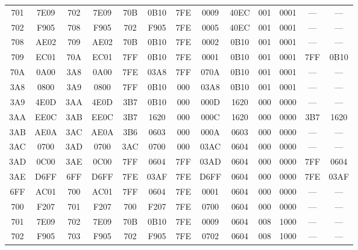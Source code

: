 \begin{flushleft}
\begin{tabular}{|c|c|c|c|c|c|c|c|c|c|c|c|c|}
		701 & 7E09 & 702 & 7E09 & 70B & 0B10 & 7FE & 0009 & 40EC & 001 & 0001 & --- & ---	\\

		702 & F905 & 708 & F905 & 702 & F905 & 7FE & 0005 & 40EC & 001 & 0001 & --- & ---	\\

		708 & AE02 & 709 & AE02 & 70B & 0B10 & 7FE & 0002 & 0B10 & 001 & 0001 & --- & ---	\\

		709 & EC01 & 70A & EC01 & 7FF & 0B10 & 7FE & 0001 & 0B10 & 001 & 0001 & 7FF & 0B10	\\

		70A & 0A00 & 3A8 & 0A00 & 7FE & 03A8 & 7FF & 070A & 0B10 & 001 & 0001 & --- & ---	\\
		\hline
		3A8 & 0800 & 3A9 & 0800 & 7FF & 0B10 & 000 & 03A8 & 0B10 & 001 & 0001 & --- & ---	\\

		3A9 & 4E0D & 3AA & 4E0D & 3B7 & 0B10 & 000 & 000D & 1620 & 000 & 0000 & --- & ---	\\

		3AA & EE0C & 3AB & EE0C & 3B7 & 1620 & 000 & 000C & 1620 & 000 & 0000 & 3B7 & 1620	\\

		3AB & AE0A & 3AC & AE0A & 3B6 & 0603 & 000 & 000A & 0603 & 000 & 0000 & --- & ---	\\

		3AC & 0700 & 3AD & 0700 & 3AC & 0700 & 000 & 03AC & 0604 & 000 & 0000 & --- & ---	\\

		3AD & 0C00 & 3AE & 0C00 & 7FF & 0604 & 7FF & 03AD & 0604 & 000 & 0000 & 7FF & 0604	\\

		3AE & D6FF & 6FF & D6FF & 7FE & 03AF & 7FE & D6FF & 0604 & 000 & 0000 & 7FE & 03AF	\\
		\hline
		6FF & AC01 & 700 & AC01 & 7FF & 0604 & 7FE & 0001 & 0604 & 000 & 0000 & --- & ---	\\

		700 & F207 & 701 & F207 & 700 & F207 & 7FE & 0700 & 0604 & 000 & 0000 & --- & ---	\\

		701 & 7E09 & 702 & 7E09 & 70B & 0B10 & 7FE & 0009 & 0604 & 008 & 1000 & --- & ---	\\

		702 & F905 & 703 & F905 & 702 & F905 & 7FE & 0702 & 0604 & 008 & 1000 & --- & ---	\\


\end{tabular}
\end{flushleft}
